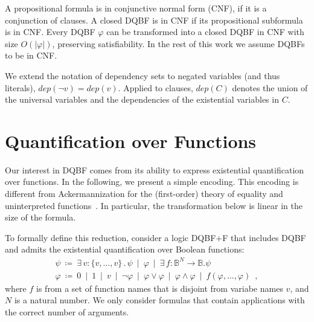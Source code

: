 \documentclass{svjour3}
\newcommand{\ldot}{\mathpunct{.}}
\newcommand{\set}[1]{{\{#1\}}}
\newcommand{\dep}{\mathit{dep}}
\begin{document}
A propositional formula is in conjunctive normal form (CNF), if it is a conjunction of clauses. 
A closed DQBF is in CNF if its propositional subformula is in CNF.
Every DQBF $\varphi$ can be transformed into a closed DQBF in CNF with size $O(|\varphi|)$, preserving satisfiability. 
In the rest of this work we assume DQBFs to be in CNF.

We extend the notation of dependency sets to negated variables (and thus literals), $\dep(\neg v)=\dep(v)$. 
Applied to clauses, $\dep(C)$ denotes the union of the universal variables and the dependencies of the existential variables in $C$.


\section{Quantification over Functions}
\label{sect:functions}

Our interest in DQBF comes from its ability to express existential quantification over functions.
In the following, we present a simple encoding.
This encoding is different from Ackermannization for the (first-order) theory of equality and uninterpreted functions~\cite{BruttomessoCimattiFranzenGriggioSantuariSebastiani/2006/Ackermannization}. 
In particular, the transformation below is linear in the size of the formula. 

To formally define this reduction, consider a logic DQBF+F that includes DQBF and admits the existential quantification over Boolean functions:
\[
\begin{array}{l}
  \psi ~\coloneqq~ \exists\, v :  \set{ v,\dots,v }\ldot \psi ~\mid~ \varphi ~\mid~ \exists\, f:\mathbb{B}^N\to\mathbb{B}.\psi \\
  \varphi ~\coloneqq~ 0 ~\mid~ 1 ~\mid~ v ~\mid~ \neg \varphi ~\mid~ \varphi \lor \varphi ~\mid~ \varphi \land \varphi ~\mid~ f(\varphi,\dots,\varphi)  \enspace,
\end{array}
\]
where $f$ is from a set of function names that is disjoint from variabe names $v$, and $N$ is a natural number.
We only consider formulas that contain applications with the correct number of arguments.
\end{document}
